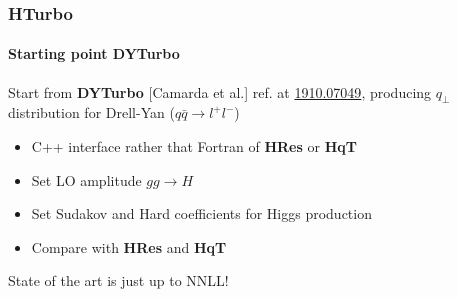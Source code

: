 \documentclass[aspectratio=43]{beamer}
\begin{document}
\begin{frame}

	\frametitle{HTurbo}
	\framesubtitle{Starting point DYTurbo}

	Start from \textbf{DYTurbo} {\color{blue}[Camarda et al.]} ref. at {\color{blue} \href{https://arxiv.org/abs/1910.07049}{1910.07049}}, producing $q_{\perp}$ distribution for Drell-Yan ($q\bar{q} \rightarrow l^{+}l^{-}$) 
	
	\begin{itemize}
		\item 	{\color{blue}C++} interface rather that {\color{red}Fortran} of \textbf{HRes} or \textbf{HqT}
		\item Set LO amplitude $gg \rightarrow H$
		\item Set Sudakov and Hard coefficients for Higgs production
		\item Compare with \textbf{HRes} and \textbf{HqT}
	\end{itemize}

	\vspace{0.5 cm}

	{\color{red} State of the art is just up to NNLL!}

\end{frame}
\end{document}
